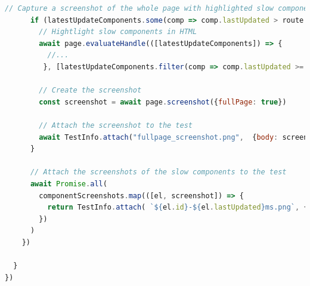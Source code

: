 \documentclass[a4paper, 10pt]{article}
\begin{document}
\begin{lstlisting}[caption={Test file for component load times}, label={lst:dynamic-performance-spec}, language=JavaScript]
      // Capture a screenshot of the whole page with highlighted slow components
      if (latestUpdateComponents.some(comp => comp.lastUpdated > route.pageLoadBudgetMs)){
        // Hightlight slow components in HTML
        await page.evaluateHandle(([latestUpdateComponents]) => {
          //...
         }, [latestUpdateComponents.filter(comp => comp.lastUpdated >= route.pageLoadBudgetMs)])

        // Create the screenshot
        const screenshot = await page.screenshot({fullPage: true})

        // Attach the screenshot to the test
        await TestInfo.attach("fullpage_screenshot.png",  {body: screenshot, contentType: 'image/png'})
      }

      // Attach the screenshots of the slow components to the test
      await Promise.all(
        componentScreenshots.map(([el, screenshot]) => {
          return TestInfo.attach( `${el.id}-${el.lastUpdated}ms.png`, {body: screenshot, contentType: 'image/png'})
        })
      )
    })

  }
})
\end{lstlisting}
\end{document}

